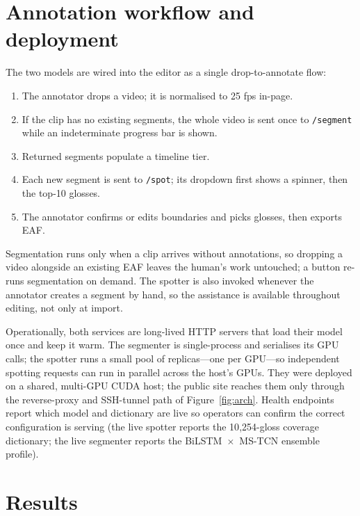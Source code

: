 \documentclass[11pt]{article}
\newcommand{\code}[1]{\texttt{\small #1}}
\begin{document}
\section{Annotation workflow and deployment}\label{sec:deploy}
The two models are wired into the editor as a single drop-to-annotate flow:
\begin{enumerate}\itemsep1pt
\item The annotator drops a video; it is normalised to 25 fps in-page.
\item If the clip has no existing segments, the whole video is sent once to \code{/segment}
  while an indeterminate progress bar is shown.
\item Returned segments populate a timeline tier.
\item Each new segment is sent to \code{/spot}; its dropdown first shows a spinner, then the
  top-10 glosses.
\item The annotator confirms or edits boundaries and picks glosses, then exports EAF.
\end{enumerate}
Segmentation runs only when a clip arrives without annotations, so dropping a video alongside an
existing EAF leaves the human's work untouched; a button re-runs segmentation on demand. The
spotter is also invoked whenever the annotator creates a segment by hand, so the assistance is
available throughout editing, not only at import.

Operationally, both services are long-lived HTTP servers that load their model once and keep it
warm. The segmenter is single-process and serialises its GPU calls; the spotter runs a small
pool of replicas---one per GPU---so independent spotting requests can run in parallel across the
host's GPUs. They were deployed on a shared, multi-GPU CUDA host; the public site reaches them
only through the reverse-proxy and SSH-tunnel path of Figure~\ref{fig:arch}. Health endpoints
report which model and dictionary are live so operators can confirm the correct configuration is
serving (the live spotter reports the 10{,}254-gloss coverage dictionary; the live segmenter
reports the BiLSTM~$\times$~MS-TCN ensemble profile).

\section{Results}\label{sec:results}
\end{document}
